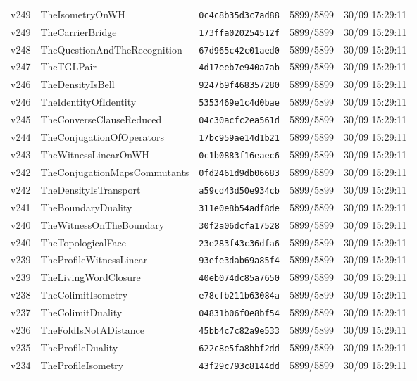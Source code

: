 \documentclass[11pt]{article}
\theoremstyle{definition}\newtheorem{deriv}{Derivação}
\begin{document}
{\begin{longtable}{@{}lllll@{}}
v249 & TheIsometryOnWH & \texttt{0c4c8b35d3c7ad88} & 5899/5899 & 30/09 15:29:11 \\
v249 & TheCarrierBridge & \texttt{173ffa020254512f} & 5899/5899 & 30/09 15:29:11 \\
v248 & TheQuestionAndTheRecognition & \texttt{67d965c42c01aed0} & 5899/5899 & 30/09 15:29:11 \\
v247 & TheTGLPair & \texttt{4d17eeb7e940a7ab} & 5899/5899 & 30/09 15:29:11 \\
v246 & TheDensityIsBell & \texttt{9247b9f468357280} & 5899/5899 & 30/09 15:29:11 \\
v246 & TheIdentityOfIdentity & \texttt{5353469e1c4d0bae} & 5899/5899 & 30/09 15:29:11 \\
v245 & TheConverseClauseReduced & \texttt{04c30acfc2ea561d} & 5899/5899 & 30/09 15:29:11 \\
v244 & TheConjugationOfOperators & \texttt{17bc959ae14d1b21} & 5899/5899 & 30/09 15:29:11 \\
v243 & TheWitnessLinearOnWH & \texttt{0c1b0883f16eaec6} & 5899/5899 & 30/09 15:29:11 \\
v242 & TheConjugationMapsCommutants & \texttt{0fd2461d9db06683} & 5899/5899 & 30/09 15:29:11 \\
v242 & TheDensityIsTransport & \texttt{a59cd43d50e934cb} & 5899/5899 & 30/09 15:29:11 \\
v241 & TheBoundaryDuality & \texttt{311e0e8b54adf8de} & 5899/5899 & 30/09 15:29:11 \\
v240 & TheWitnessOnTheBoundary & \texttt{30f2a06dcfa17528} & 5899/5899 & 30/09 15:29:11 \\
v240 & TheTopologicalFace & \texttt{23e283f43c36dfa6} & 5899/5899 & 30/09 15:29:11 \\
v239 & TheProfileWitnessLinear & \texttt{93efe3dab69a85f4} & 5899/5899 & 30/09 15:29:11 \\
v239 & TheLivingWordClosure & \texttt{40eb074dc85a7650} & 5899/5899 & 30/09 15:29:11 \\
v238 & TheColimitIsometry & \texttt{e78cfb211b63084a} & 5899/5899 & 30/09 15:29:11 \\
v237 & TheColimitDuality & \texttt{04831b06f0e8bf54} & 5899/5899 & 30/09 15:29:11 \\
v236 & TheFoldIsNotADistance & \texttt{45bb4c7c82a9e533} & 5899/5899 & 30/09 15:29:11 \\
v235 & TheProfileDuality & \texttt{622c8e5fa8bbf2dd} & 5899/5899 & 30/09 15:29:11 \\
v234 & TheProfileIsometry & \texttt{43f29c793c8144dd} & 5899/5899 & 30/09 15:29:11 \\

\end{longtable}}
\end{document}
